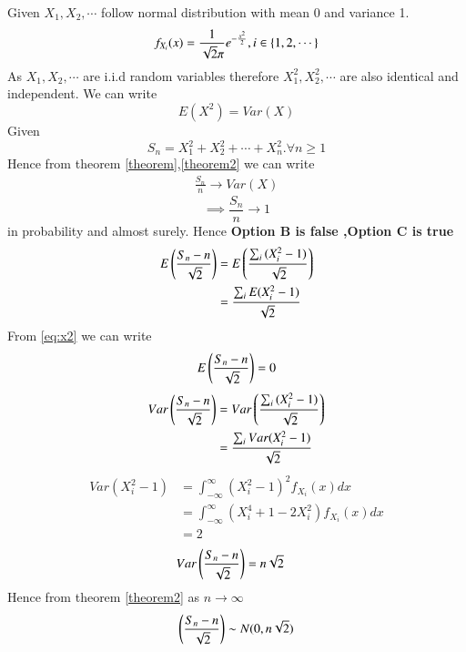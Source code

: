 \documentclass[journal,12pt,twocolumn]{IEEEtran}
\begin{document}
Given $X_1,X_2, \cdots$ follow normal distribution with mean 0 and variance 1.
\begin{equation}
    f_{X_i}(x)=\frac{1}{\sqrt{2}\pi}e^{-\frac{x^2}{2}} ,i \in \left\{1,2,\cdots\right\}
\end{equation}
As $X_1,X_2,\cdots $ are i.i.d random variables therefore $X_{1}^2,X_
{2}^2,\cdots$ are also identical and independent.
We can write
\begin{equation}
    E(X^2)=Var(X) \label{eq:x2}
\end{equation}
Given 
\begin{equation}
    S_{n}=X_{1}^2+X_{2}^2+\cdots+X_{n}^2.\forall n\geq 1
\end{equation}
Hence from theorem \ref{theorem},\ref{theorem2} we can write 
\begin{align}
    \frac{S_n}{n} \to Var(X)
\end{align}
\begin{equation}
    \implies \frac{S_n}{n} \to 1
\end{equation}
in probability and almost surely.
Hence \textbf{Option B is false ,Option C is true}
\begin{align}
    E\left(\frac{S_{n}-n}{\sqrt{2}}\right)&=E\left(\frac{\sum_{i}{(X_{i}^{2}-1)}}{\sqrt{2}}\right)\\
    &={\frac{\sum_{i}E{(X_{i}^{2}-1)}}{\sqrt{2}}}\label{eq:expectation}
\end{align}
From \eqref{eq:x2} we can write
\begin{equation}
    E\left(\frac{S_{n}-n}{\sqrt{2}}\right)=0
\end{equation}
\begin{align}
    Var\left(\frac{S_{n}-n}{\sqrt{2}}\right)&=Var\left(\frac{\sum_{i}{(X_{i}^{2}-1)}}{\sqrt{2}}\right)\\
    &={\frac{\sum_{i}Var{(X_{i}^{2}-1)}}{\sqrt{2}}}
\end{align}
\begin{align}
    Var(X_{i}^2-1)&=\int_{-\infty}^{\infty}(X_{i}^2-1)^2 f_{X_{i}}(x)dx\\
    &=\int_{-\infty}^{\infty}(X_{i}^4+1-2X_{i}^{2}) f_{X_{i}}(x)dx\\
    &=2\label{eq:var}
\end{align}
\begin{align}
    Var\left(\frac{S_{n}-n}{\sqrt{2}}\right)&=n\sqrt{2}    
\end{align}
Hence from theorem \ref{theorem2} as $n \to \infty$
\begin{equation}
    \left(\frac{S_{n}-n}{\sqrt{2}}\right)\sim N(0,n\sqrt{2})
\end{equation}
\end{document}
